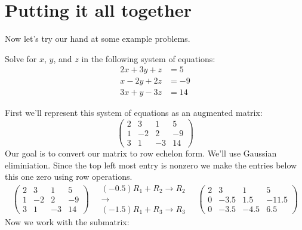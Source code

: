 \documentclass{ximera}
\begin{document}
\section{Putting it all together}

Now let's try our hand at some example problems.


\begin{example}
  Solve for $x$, $y$, and $z$ in the following system of equations:
  \begin{align*}
    2x + 3y + z  &= 5 \\
    x -2y+ 2z &=-9\\
    3x +y- 3z &=14
  \end{align*}

\begin{explanation}
First we'll represent this system of equations as an augmented matrix:
\[
  \left(
    \begin{array}{ccc|c}
      2 & 3 & 1 & 5 \\
      1 &  -2 & 2 &-9 \\
      3 &  1 & -3 & 14
    \end{array}
  \right)
\]
Our goal is to convert our matrix to row echelon form. We'll use
Gaussian eliminiation. Since the top left most entry is nonzero we
make the entries below this one zero using row operations.
\[
  \begin{pmatrix}
    2 & 3 & 1 & 5 \\
    1 &  -2 & 2 &-9 \\
    3 &  1 & -3 & 14
  \end{pmatrix}
  \quad
  \begin{array}{c}
    \scriptstyle(-0.5) R_1+R_2\to R_2\\ \longrightarrow\\  \scriptstyle(-1.5) R_1+R_3\to R_3
  \end{array}
  \quad
  \begin{pmatrix}
    2 & 3 & 1 & 5 \\
    0 & -3.5 & 1.5 &-11.5 \\
    0 & -3.5 & -4.5 & 6.5
  \end{pmatrix}
\]
Now we work with the submatrix:
\begin{center}
\end{center}
\end{explanation}
\end{example}
\end{document}
